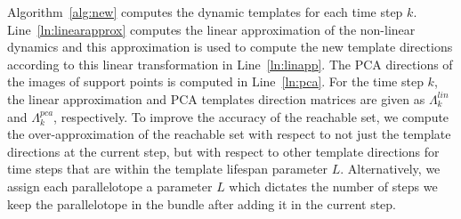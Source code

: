 Algorithm~\ref{alg:new} computes the dynamic templates for each time step $k$.
%
Line~\ref{ln:linearapprox} computes the linear approximation of the non-linear dynamics and this approximation is used to compute the new template directions according to this linear transformation in Line~\ref{ln:linapp}.
%
The PCA directions of the images of support points is computed in Line~\ref{ln:pca}.
%
For the time step $k$, the linear approximation and PCA templates direction matrices are given as $\Lambda_{k}^{lin}$ and $\Lambda_{k}^{pca}$, respectively.
%
To improve the accuracy of the reachable set, we compute the over-approximation of the reachable set with respect to not just the template directions at the current step, but with respect to other template directions for time steps that are within the template lifespan parameter $L$.
%
Alternatively, we assign each parallelotope a parameter $L$ which dictates the number of steps we keep the parallelotope in the bundle after adding it in the current step.
